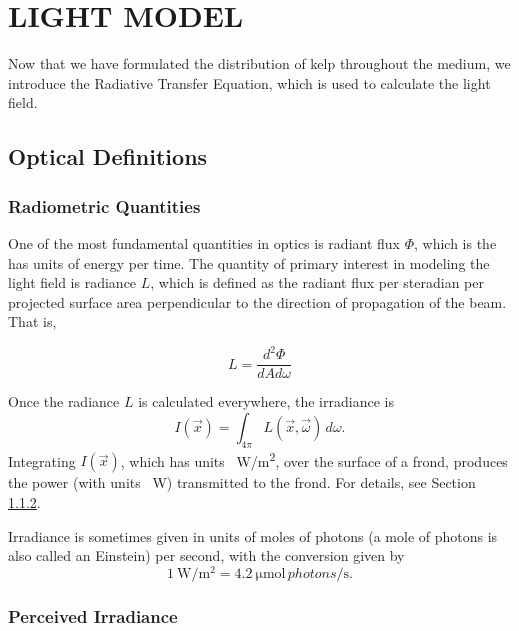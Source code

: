 \chapter{LIGHT MODEL}
\label{chap:light}

Now that we have formulated the distribution of kelp throughout the medium, we introduce the Radiative Transfer Equation, which is used to calculate the light field.

\section{Optical Definitions}

\subsection{Radiometric Quantities}

One of the most fundamental quantities in optics is radiant flux $\Phi$, which is the has units of energy per time.
The quantity of primary interest in modeling the light field is radiance $L$, which is defined as the radiant flux per steradian per projected surface area perpendicular to the direction of propagation of the beam.
That is,

\begin{equation*}
	L = \frac{d^2\Phi}{dA d\omega}
\end{equation*}

Once the radiance $L$ is calculated everywhere, the irradiance is
\begin{equation*}
  I(\vec{x}) = \int_{4\pi}L(\vec{x},\vec{\omega})\, d\omega.
\end{equation*}
Integrating $I(\vec{x})$, which has units \SI{}{\W/m^2}, over the surface of a frond, produces the power (with units \SI{}{\W}) transmitted to the frond.
For details, see Section \ref{sec:perceived_irrad}.

Irradiance is sometimes given in units of moles of photons (a mole of photons is also called an Einstein) per second, with the conversion \cite{mobley_light_1994} given by
\begin{equation*}
  \SI{1}{\W\per\m^2} = \SI{4.2}{\micro\mole \,photons\per\second}.
\end{equation*}

\subsection{Perceived Irradiance}
\label{sec:perceived_irrad}

